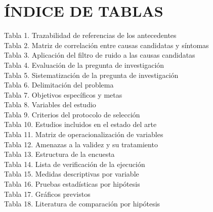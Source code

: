 
\section*{\centering ÍNDICE DE TABLAS}
Tabla 1. Trazabilidad de referencias de los antecedentes\\
Tabla 2. Matriz de correlación entre causas candidatas y síntomas\\
Tabla 3. Aplicación del filtro de ruido a las causas candidatas\\
Tabla 4. Evaluación de la pregunta de investigación\\
Tabla 5. Sistematización de la pregunta de investigación\\
Tabla 6. Delimitación del problema\\
Tabla 7. Objetivos específicos y metas\\
Tabla 8. Variables del estudio\\
Tabla 9. Criterios del protocolo de selección\\
Tabla 10. Estudios incluidos en el estado del arte\\
Tabla 11. Matriz de operacionalización de variables\\
Tabla 12. Amenazas a la validez y su tratamiento\\
Tabla 13. Estructura de la encuesta\\
Tabla 14. Lista de verificación de la ejecución\\
Tabla 15. Medidas descriptivas por variable\\
Tabla 16. Pruebas estadísticas por hipótesis\\
Tabla 17. Gráficos previstos\\
Tabla 18. Literatura de comparación por hipótesis\\

\vspace{1cm}
